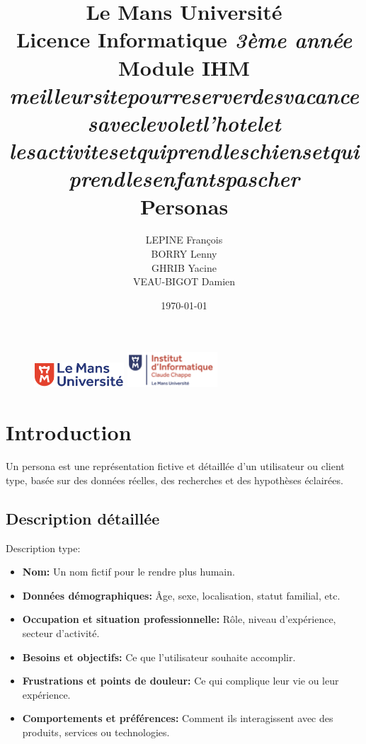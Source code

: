 \documentclass[a4paper,11pt]{article}
\begin{document}
\begin{figure}
\includegraphics[width=0.3\textwidth]{images/logolemansU.png}
\hspace{150pt} 
\includegraphics[width=0.3\textwidth]{images/logo_ic2.png} 
\end{figure}

\title{\textbf{\color{blue} Le Mans Université}\color{black}
\\ Licence Informatique \textit{3ème année}
\\ Module IHM
\\ \textit{meilleursitepourreserverdesvacancesaveclevoletl'hotelet\\lesactivitesetquiprendleschiensetquiprendlesenfantspascher}
\\ \textbf{Personas}}
\author{LEPINE François\\BORRY Lenny\\GHRIB Yacine\\VEAU-BIGOT Damien}
\date{\today} 
\maketitle 
\newpage

\tableofcontents
\newpage


\section{Introduction}
Un persona est une représentation fictive et détaillée d'un utilisateur ou client type, basée sur des données réelles, des recherches et des hypothèses éclairées.
\subsection{Description détaillée}
\noindent Description type:
\begin{itemize}
    \item \textbf{Nom:} Un nom fictif pour le rendre plus humain.
    \item \textbf{Données démographiques:} Âge, sexe, localisation, statut familial, etc.
    \item \textbf{Occupation et situation professionnelle:}  Rôle, niveau d'expérience, secteur d'activité.
    \item \textbf{Besoins et objectifs:} Ce que l'utilisateur souhaite accomplir.
    \item \textbf{Frustrations et points de douleur:} Ce qui complique leur vie ou leur expérience.
    \item \textbf{Comportements et préférences:} Comment ils interagissent avec des produits, services ou technologies.
\end{itemize}
\end{document}
